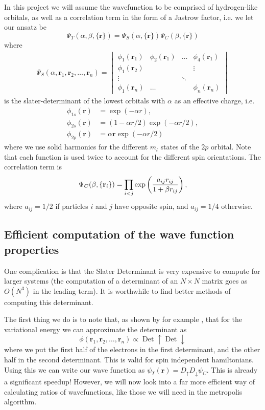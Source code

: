 \documentclass[aps,prc,twocolumn,floatfix]{revtex4}
\def\rvec{\textbf{r}}
\begin{document}
In this project we will assume the wavefunction to be comprised of hydrogen-like orbitals, as well as a correlation term in the form of a Jastrow factor, i.e. we let our ansatz be 
\begin{equation}
 \Psi_T(\alpha, \beta, \{\rvec\}) = \Psi_S(\alpha, \{\rvec\} ) \Psi_C(\beta,\{\rvec\})
\end{equation}
where 
\begin{align}
 \Psi_S(\alpha, \rvec_1, \rvec_2, \ldots, \rvec_n) = \begin{vmatrix}
  \phi_1(\rvec_1) & \phi_2(\rvec_1) & \ldots & \phi_4(\rvec_1)\\
  \phi_1(\rvec_2) &  & & \vdots \\
  \vdots &  & \ddots & \\
  \phi_1(\rvec_n) & \ldots  &  & \phi_n(\rvec_n)
\end{vmatrix}
\end{align}
is the slater-determinant of the lowest orbitals with $\alpha$ as an effective charge, i.e.
\begin{align}
 \phi_{1s}(\rvec) & = \exp(-\alpha r), \\
 \phi_{2s}(\rvec) & = (1-\alpha r/2)\exp(-\alpha r/2), \\
 \phi_{2p}(\rvec) & = \alpha \rvec \exp(-\alpha r/2)
\end{align}
where we use solid harmonics for the different $m_l$ states of the $2p$ orbital. Note that each function is used twice to account for the different spin orientations. The correlation term is 
\begin{equation}
 \Psi_C(\beta, \{ \rvec_i \}) = \prod_{i<j} \exp\left({a_{ij} r_{ij} \over 1 + \beta r_{ij}} \right),
\end{equation}
where $a_{ij} = 1/2$ if particles $i$ and $j$ have opposite spin, and $a_{ij} = 1/4$ otherwise. 


\subsection{Efficient computation of the wave function properties}
One complication is that the Slater Determinant is very expensive to compute for larger systems (the computation of a determinant of an $N \times N$ matrix goes as $O(N^3)$ in the leading term). It is worthwhile to find better methods of computing this determinant. 

The first thing we do is to note that, as shown by for example \cite{moskowitz81}, that for the variational energy we can approximate the determinant as 
\begin{equation}
 \phi(\rvec_1, \rvec_2, \ldots, \rvec_n) \propto \operatorname{Det}\uparrow \operatorname{Det}\downarrow
\end{equation}
where we put the first half of the electrons in the first determinant, and the other half in the second determinant. This is valid for spin independent hamiltonians. Using this we can write our wave function as $\psi_T (\rvec) = D_\uparrow D_\downarrow \psi_C$. This is already a significant speedup! However, we will now look into a far more efficient way of calculating ratios of wavefunctions, like those we will need in the metropolis algorithm.
\end{document}
